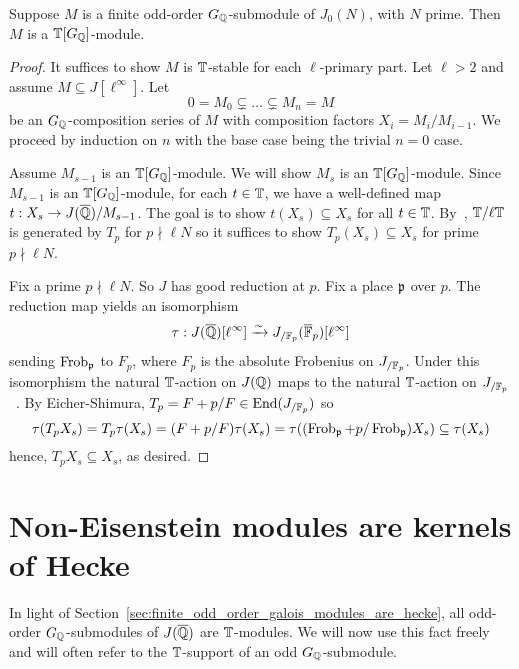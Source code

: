 \begin{proposition}\label{prop:G_modules_are_hecke}
    Suppose $M$ is a finite odd-order $G_{\mathbb{Q}}$-submodule of $J_0(N)$, with $N$
    prime. Then $M$ is a $\mathbb{T}[G_{\mathbb{Q}}]$-module.
\end{proposition}
\begin{proof}
    It suffices to show $M$ is $\mathbb{T}$-stable for each $\ell$-primary part. Let
    $\ell>2$ and assume $M\subseteq J[\ell^\infty]$. Let
    \[
        0 = M_0 \subsetneq \ldots \subsetneq M_n = M
    \]
    be an $G_{\mathbb{Q}}$-composition series of $M$ with composition factors $X_i =
    M_i/M_{i-1}$. We proceed by induction on $n$ with the base
    case being the trivial $n=0$ case.

    Assume $M_{s-1}$ is an $\mathbb{T}[G_{\mathbb{Q}}]$-module. We will show $M_s$ is an
    $\mathbb{T}[G_{\mathbb{Q}}]$-module. Since $M_{s-1}$ is an $\mathbb{T}[G_{\mathbb{Q}}]$-module, for each
    $t\in \mathbb{T}$, we have a well-defined map $t:X_s\to J(\overline{\mathbb{Q}})/M_{s-1}$. The
    goal is to show $t(X_s)\subseteq X_s$ for all $t\in \mathbb{T}$.
    By~\cite[Proposition 2]{ribet:mult_p_finite}, $\mathbb{T}/\ell \mathbb{T}$ is generated
    by $T_p$ for $p\nmid \ell N$ so it suffices to show $T_p(X_s)\subseteq X_s$
    for prime $p\nmid \ell N$.

    Fix a prime $p\nmid \ell N$. So $J$ has good reduction at $p$. Fix a place
    $\mathfrak{p}$ over $p$. The reduction map
    yields an isomorphism~\cite[Theorem 1, Lemma 2]{serre-tate}
    \[
        \tau:J(\overline{\mathbb{Q}})[\ell^\infty] \xrightarrow{\sim} J_{/\mathbb{F}_p} (\overline{\mathbb{F}}_p)[\ell^\infty]
    \]
    sending $\operatorname{Frob}_{\mathfrak{p}}$ to $F_p$, where $F_p$ is the absolute Frobenius on
    $J_{/\mathbb{F}_p}$. Under this isomorphism the natural $\mathbb{T}$-action on $J(\mathbb{Q})$
    maps to the natural $\mathbb{T}$-action on $J_{/\mathbb{F}_p}$~\cite[\S
    5.2]{ribet-stein:serre}. By Eicher-Shimura, $T_p = F+p/F\in
    \operatorname{End}(J_{/\mathbb{F}_p})$ so
    \[
        \tau(T_p X_s)
        = T_p\tau(X_s)
        = (F+p/F)\tau(X_s)
        = \tau((\operatorname{Frob}_{\mathfrak{p}}+p/\operatorname{Frob}_{\mathfrak{p}})X_s)
        \subseteq \tau(X_s)
    \]
    hence, $T_p X_s\subseteq X_s$, as desired.
\end{proof}


\section{Non-Eisenstein modules are kernels of Hecke}%
\label{sec:non_eisenstein_modules_are_kernels_of_hecke}

In light of Section~\ref{sec:finite_odd_order_galois_modules_are_hecke}, all
odd-order $G_{\mathbb{Q}}$-submodules of $J(\overline{\mathbb{Q}})$ are $\mathbb{T}$-modules. We will now
use this fact freely and will often refer to the $\mathbb{T}$-support of an odd
$G_{\mathbb{Q}}$-submodule.

